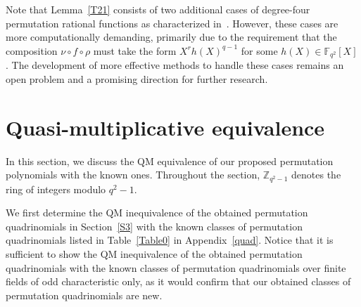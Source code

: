 \documentclass[12pt]{amsart}
\numberwithin{equation}{section}
\theoremstyle{definition}
\newcommand{\F}{\mathbb F}
\begin{document}

Note that Lemma~\ref{T21} consists of two additional cases of degree-four permutation rational functions as characterized in~\cite[Theorem~1.4]{Ding2020}. However, these cases are more computationally demanding, primarily due to the requirement that the composition $\nu \circ f \circ \rho$ must take the form $X^r h(X)^{q-1}$ for some $h(X) \in \mathbb{F}_{q^2}[X]$. The development of more effective methods to handle these cases remains an open problem and a promising direction for further research.


\section{Quasi-multiplicative equivalence}\label{S5}

In this section, we discuss the QM equivalence of our proposed permutation polynomials with the known ones. Throughout the section, $\mathbb{Z}_{q^2-1}$ denotes the ring of integers modulo $q^2-1$.

We first determine the QM inequivalence of the obtained permutation quadrinomials in Section~\ref{S3} with the known classes of permutation quadrinomials listed in Table~\ref{Table0} in Appendix~\ref{quad}. Notice that it is sufficient to show the QM inequivalence of the obtained permutation quadrinomials with the known classes of permutation quadrinomials over finite fields of odd characteristic only, as it would confirm that our obtained classes of permutation quadrinomials are new.
\end{document}
